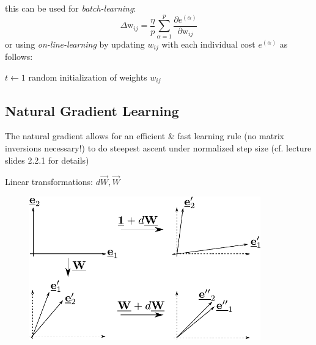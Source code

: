 this can be used for \emph{batch-learning}:
\begin{equation}
	\Delta \mathrm{w}_{ij}
	= \frac{\eta}{p} \sum\limits_{\alpha = 1}^p 
	\frac{\partial e^{(\alpha)}}{\partial \mathrm{w}_{ij}}
\end{equation}
or using \emph{on-line-learning} by updating $w_{ij}$ with each individual cost $e^{(\alpha)}$ as follows:
\begin{algorithm}[ht]
  \DontPrintSemicolon
  $t \leftarrow 1$\;
  random initialization of weights $w_{ij}$\;
\label{alg:onlineGD}
\end{algorithm}

\newpage

\subsection{Natural Gradient Learning}
The natural gradient allows for an efficient \& fast learning rule (no matrix inversions
  necessary!) to do steepest ascent under normalized step size (cf. lecture slides 2.2.1 for details)

Linear transformations: $d \vec{W}, \vec{W}$
\begin{figure}[h]
  \centering
\includegraphics[width=10cm]{img/section2_fig18}  
  \label{fig:NatGrad}
\end{figure}


\newpage

